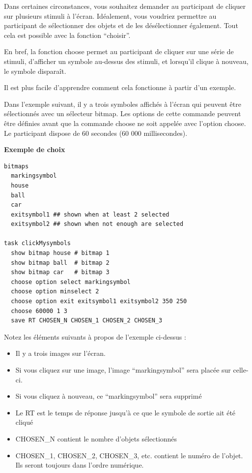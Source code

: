 \documentclass[
]{book}
\providecommand{\tightlist}{%
  \setlength{\itemsep}{0pt}\setlength{\parskip}{0pt}}
\begin{document}
Dans certaines circonstances, vous souhaitez demander au participant de cliquer sur plusieurs stimuli à l'écran. Idéalement, vous voudriez permettre au participant de sélectionner des objets et de les désélectionner également. Tout cela est possible avec la fonction ``choisir''.

En bref, la fonction choose permet au participant de cliquer sur une série de stimuli, d'afficher un symbole au-dessus des stimuli, et lorsqu'il clique à nouveau, le symbole disparaît.

Il est plus facile d'apprendre comment cela fonctionne à partir d'un exemple.

Dans l'exemple suivant, il y a trois symboles affichés à l'écran qui peuvent être sélectionnés avec un sélecteur bitmap. Les options de cette commande peuvent être définies avant que la commande choose ne soit appelée avec l'option choose. Le participant dispose de 60 secondes (60 000 millisecondes).

\textbf{Exemple de choix}

\begin{verbatim}
bitmaps
  markingsymbol
  house
  ball
  car
  exitsymbol1 ## shown when at least 2 selected
  exitsymbol2 ## shown when not enough are selected

task clickMysymbols
  show bitmap house # bitmap 1
  show bitmap ball  # bitmap 2
  show bitmap car   # bitmap 3
  choose option select markingsymbol
  choose option minselect 2
  choose option exit exitsymbol1 exitsymbol2 350 250
  choose 60000 1 3
  save RT CHOSEN_N CHOSEN_1 CHOSEN_2 CHOSEN_3
\end{verbatim}

Notez les éléments suivants à propos de l'exemple ci-dessus :

\begin{itemize}
\tightlist
\item
  Il y a trois images sur l'écran.
\item
  Si vous cliquez sur une image, l'image ``markingsymbol'' sera placée sur celle-ci.
\item
  Si vous cliquez à nouveau, ce ``markingsymbol'' sera supprimé
\item
  Le RT est le temps de réponse jusqu'à ce que le symbole de sortie ait été cliqué
\item
  CHOSEN\_N contient le nombre d'objets sélectionnés
\item
  CHOSEN\_1, CHOSEN\_2, CHOSEN\_3, etc. contient le numéro de l'objet. Ils seront toujours dans l'ordre numérique.
\end{itemize}
\end{document}

